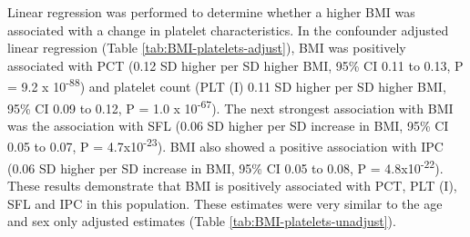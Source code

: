 \documentclass[11pt,twoside]{bristolthesis}
\begin{document}
Linear regression was performed to determine whether a higher BMI was associated with a change in platelet characteristics. In the confounder adjusted linear regression (Table \ref{tab:BMI-platelets-adjust}), BMI was positively associated with PCT (0.12 SD higher per SD higher BMI, 95\% CI 0.11 to 0.13, P = 9.2 x 10\textsuperscript{-88}) and platelet count (PLT (I) 0.11 SD higher per SD higher BMI, 95\% CI 0.09 to 0.12, P = 1.0 x 10\textsuperscript{-67}). The next strongest association with BMI was the association with SFL (0.06 SD higher per SD increase in BMI, 95\% CI 0.05 to 0.07, P = 4.7x10\textsuperscript{-23}). BMI also showed a positive association with IPC (0.06 SD higher per SD increase in BMI, 95\% CI 0.05 to 0.08, P = 4.8x10\textsuperscript{-22}). These results demonstrate that BMI is positively associated with PCT, PLT (I), SFL and IPC in this population. These estimates were very similar to the age and sex only adjusted estimates (Table \ref{tab:BMI-platelets-unadjust}).
\end{document}
